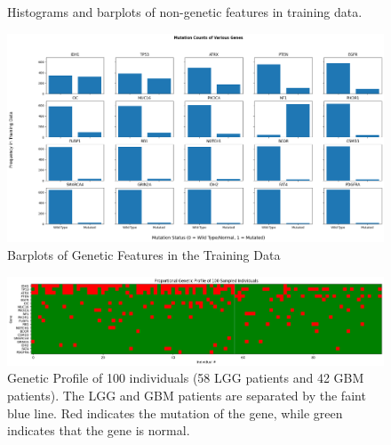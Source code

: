 \documentclass[12pt]{article}
\newtheorem{Proof of Lemma}{Proof of Lemma}
\begin{document}
\begin{figure}[h!]
  \centering
  \caption{Histograms and barplots of non-genetic features in training data.}
  \label{fig:nongenes}
\end{figure}

\begin{figure}[h!]
  \centering
  \includegraphics[scale = 0.36]{genes.png}
  \caption{Barplots of Genetic Features in the Training Data}
  \label{fig:genes}
\end{figure}

\begin{figure}[h!]
  \centering
  \includegraphics[scale = 0.36]{mutgrid.png}
  \caption{Genetic Profile of 100 individuals (58 LGG patients and 42 GBM patients). The LGG and GBM patients are separated by the faint blue line. Red indicates the mutation of the gene, while green indicates that the gene is normal.}
  \label{fig:mutgrid}
\end{figure}
\end{document}
